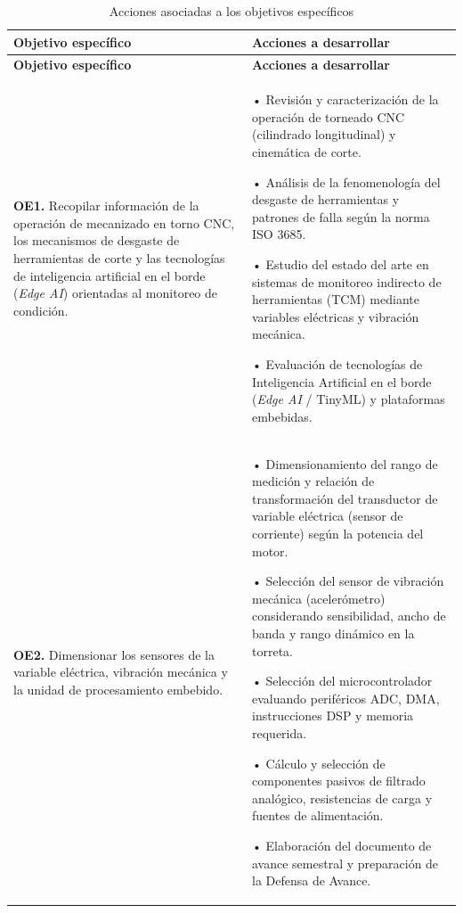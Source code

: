{\setlength{\parskip}{1.5pt}
\begin{longtable}{|>{\raggedright\arraybackslash}p{4.8cm}|>{\raggedright\arraybackslash}p{9.2cm}|}
\caption{Acciones asociadas a los objetivos específicos}
\label{tab:acciones_objetivos}
\\
\hline
\textbf{Objetivo específico} & \textbf{Acciones a desarrollar} \\
\hline \hline
\endfirsthead

\hline
\textbf{Objetivo específico} & \textbf{Acciones a desarrollar} \\
\hline \hline
\endhead

\hline
\endfoot

\hline
\multicolumn{2}{c}{\rule{0pt}{3ex}\textbf{Fuente:} Elaboración propia, 2026.}
\endlastfoot

\textbf{OE1.} Recopilar información de la operación de mecanizado en torno CNC, los mecanismos de desgaste de herramientas de corte y las tecnologías de inteligencia artificial en el borde (\textit{Edge AI}) orientadas al monitoreo de condición. & 
• Revisión y caracterización de la operación de torneado CNC (cilindrado longitudinal) y cinemática de corte.\par\vspace{1mm}
• Análisis de la fenomenología del desgaste de herramientas y patrones de falla según la norma ISO 3685.\par\vspace{1mm}
• Estudio del estado del arte en sistemas de monitoreo indirecto de herramientas (TCM) mediante variables eléctricas y vibración mecánica.\par\vspace{1mm}
• Evaluación de tecnologías de Inteligencia Artificial en el borde (\textit{Edge AI} / TinyML) y plataformas embebidas.\\ \hline

\textbf{OE2.} Dimensionar los sensores de la variable eléctrica, vibración mecánica y la unidad de procesamiento embebido. & 
• Dimensionamiento del rango de medición y relación de transformación del transductor de variable eléctrica (sensor de corriente) según la potencia del motor.\par\vspace{1mm}
• Selección del sensor de vibración mecánica (acelerómetro) considerando sensibilidad, ancho de banda y rango dinámico en la torreta.\par\vspace{1mm}
• Selección del microcontrolador evaluando periféricos ADC, DMA, instrucciones DSP y memoria requerida.\par\vspace{1mm}
• Cálculo y selección de componentes pasivos de filtrado analógico, resistencias de carga y fuentes de alimentación.\par\vspace{1mm}
• Elaboración del documento de avance semestral y preparación de la Defensa de Avance.\\ \hline


\end{longtable}}
